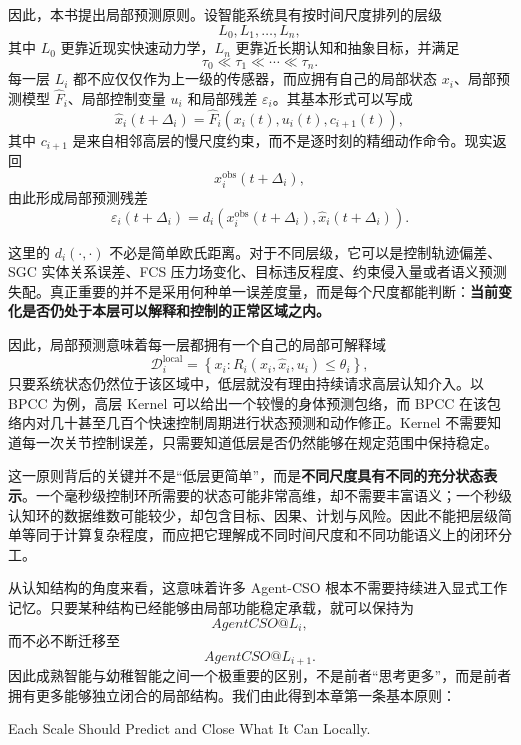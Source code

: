 因此，本书提出局部预测原则。设智能系统具有按时间尺度排列的层级
\[
L_0,L_1,\ldots,L_n,
\]
其中 $L_0$ 更靠近现实快速动力学，$L_n$ 更靠近长期认知和抽象目标，并满足
\[
\tau_0 \ll \tau_1 \ll \cdots \ll \tau_n .
\]
每一层 $L_i$ 都不应仅仅作为上一级的传感器，而应拥有自己的局部状态 $x_i$、局部预测模型 $\hat{F}_i$、局部控制变量 $u_i$ 和局部残差 $\varepsilon_i$。其基本形式可以写成
\begin{equation}
\hat{x}_i(t+\Delta_i)
=
\hat{F}_i
\left(
x_i(t),
u_i(t),
c_{i+1}(t)
\right),
\end{equation}
其中 $c_{i+1}$ 是来自相邻高层的慢尺度约束，而不是逐时刻的精细动作命令。现实返回
\begin{equation}
x_i^{\mathrm{obs}}(t+\Delta_i),
\end{equation}
由此形成局部预测残差
\begin{equation}
\varepsilon_i(t+\Delta_i)
=
d_i
\left(
x_i^{\mathrm{obs}}(t+\Delta_i),
\hat{x}_i(t+\Delta_i)
\right).
\end{equation}

这里的 $d_i(\cdot,\cdot)$ 不必是简单欧氏距离。对于不同层级，它可以是控制轨迹偏差、SGC 实体关系误差、FCS 压力场变化、目标违反程度、约束侵入量或者语义预测失配。真正重要的并不是采用何种单一误差度量，而是每个尺度都能判断：\textbf{当前变化是否仍处于本层可以解释和控制的正常区域之内。}

因此，局部预测意味着每一层都拥有一个自己的局部可解释域
\begin{equation}
\mathcal{D}_i^{\mathrm{local}}
=
\left\{
x_i:
R_i(x_i,\hat{x}_i,u_i)
\leq
\theta_i
\right\},
\end{equation}
只要系统状态仍然位于该区域中，低层就没有理由持续请求高层认知介入。以 BPCC 为例，高层 Kernel 可以给出一个较慢的身体预测包络，而 BPCC 在该包络内对几十甚至几百个快速控制周期进行状态预测和动作修正。Kernel 不需要知道每一次关节控制误差，只需要知道低层是否仍然能够在规定范围中保持稳定。

这一原则背后的关键并不是``低层更简单''，而是\textbf{不同尺度具有不同的充分状态表示}。一个毫秒级控制环所需要的状态可能非常高维，却不需要丰富语义；一个秒级认知环的数据维数可能较少，却包含目标、因果、计划与风险。因此不能把层级简单等同于计算复杂程度，而应把它理解成不同时间尺度和不同功能语义上的闭环分工。

从认知结构的角度来看，这意味着许多 Agent-CSO 根本不需要持续进入显式工作记忆。只要某种结构已经能够由局部功能稳定承载，就可以保持为
\[
AgentCSO@L_i,
\]
而不必不断迁移至
\[
AgentCSO@L_{i+1}.
\]
因此成熟智能与幼稚智能之间一个极重要的区别，不是前者``思考更多''，而是前者拥有更多能够独立闭合的局部结构。我们由此得到本章第一条基本原则：
\begin{statementbox}
Each Scale Should Predict and Close What It Can Locally.
\end{statementbox}

